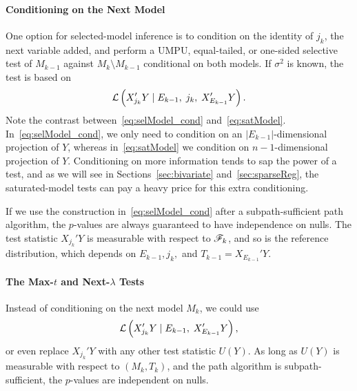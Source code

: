 \documentclass{article}
\begin{document}
\paragraph{Conditioning on the Next Model}
One option for selected-model inference is to condition on the identity of $j_k$, the next variable added, and perform a UMPU, equal-tailed, or one-sided selective test of $M_{k-1}$ against $M_{k}\setminus M_{k-1}$ conditional on both models. If $\sigma^2$ is known, the test is based on
\begin{equation}\label{eq:selModel_cond}
\mathcal{L}\left(X_{j_k}'Y \mid E_{k-1}, \; j_k, \; X_{E_{k-1}}'Y\right).
\end{equation}
Note the contrast between~\eqref{eq:selModel_cond} and~\eqref{eq:satModel}. In~\eqref{eq:selModel_cond}, we only need to condition on an $|E_{k-1}|$-dimensional projection of $Y$, whereas in~\eqref{eq:satModel} we condition on $n-1$-dimensional projection of $Y$. Conditioning on more information tends to sap the power of a test, and as we will see in Sections~\ref{sec:bivariate} and~\ref{sec:sparseReg}, the saturated-model tests can pay a heavy price for this extra conditioning.

If we use the construction in~\eqref{eq:selModel_cond} after a subpath-sufficient path algorithm, the $p$-values are always guaranteed to have independence on nulls. The test statistic $X_{j_k}'Y$ is measurable with respect to $\mathscr{F}_k$, and so is the reference distribution, which depends on $E_{k-1}, j_k,$ and $T_{k-1} = X_{E_{k-1}}'Y$.

\paragraph{The Max-$t$ and Next-$\lambda$ Tests}
Instead of conditioning on the next model $M_k$, we could use
\begin{equation}\label{eq:selModel_marg}
\mathcal{L}\left(X_{j_k}'Y \mid E_{k-1}, \; X_{E_{k-1}}'Y\right),
\end{equation}
or even replace $X_{j_k}'Y$ with any other test statistic $U(Y)$. As long as $U(Y)$ is measurable with respect to $(M_k, T_k)$, and the path algorithm is subpath-sufficient, the $p$-values are independent on nulls.
\end{document}
